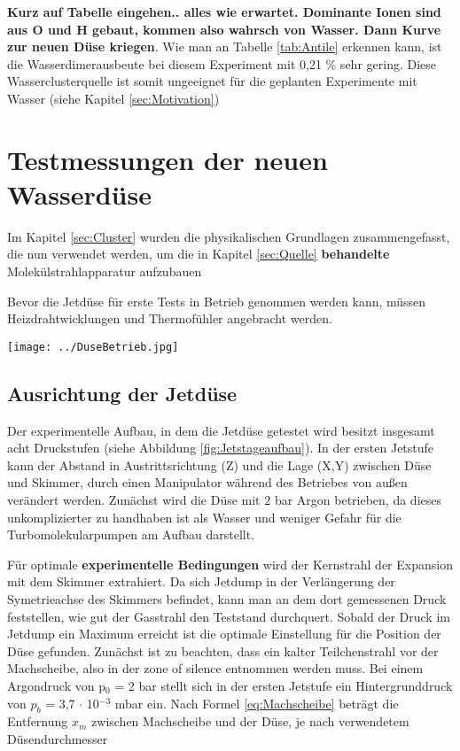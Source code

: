 \textbf{Kurz auf Tabelle eingehen.. alles wie erwartet. Dominante Ionen sind aus O und H gebaut, kommen also wahrsch von Wasser. Dann Kurve zur neuen Düse kriegen}.
Wie man an Tabelle \ref{tab:Antile} erkennen kann, ist die Wasserdimerausbeute bei diesem Experiment mit 0,21 \% sehr gering. Diese Wasserclusterquelle ist somit ungeeignet für die geplanten Experimente mit Wasser (siehe Kapitel \ref{sec:Motivation})

\section{Testmessungen der neuen Wasserdüse}

Im Kapitel \ref{sec:Cluster} wurden die physikalischen Grundlagen zusammengefasst, die nun verwendet werden, um die in Kapitel \ref{sec:Quelle} \textbf{behandelte} Molekülstrahlapparatur aufzubauen

Bevor die Jetdüse für erste Tests in Betrieb genommen werden kann, müssen Heizdrahtwicklungen und Thermofühler angebracht werden.

\begin{center}
\begin{minipage}{\linewidth}
\centering
\texttt{[image: ../DuseBetrieb.jpg]}%
 \label{fig:DuseBetrieb}
\end{minipage} 
\end{center} 

\subsection{Ausrichtung der Jetdüse}

Der experimentelle Aufbau, in dem die Jetdüse getestet wird besitzt insgesamt acht Druckstufen (siehe Abbildung \ref{fig:Jetstageaufbau}). In der ersten Jetstufe kann der Abstand in Austrittsrichtung (Z) und die Lage (X,Y) zwischen Düse und Skimmer, durch einen Manipulator während des Betriebes von außen verändert werden. Zunächst wird die Düse mit 2 bar Argon betrieben, da dieses unkomplizierter zu handhaben ist als Wasser und weniger Gefahr für die Turbomolekularpumpen am Aufbau darstellt. 

Für optimale \textbf{experimentelle Bedingungen} wird der Kernstrahl der Expansion mit dem Skimmer extrahiert. Da sich Jetdump in der Verlängerung der Symetrieachse des Skimmers befindet, kann man an dem dort gemessenen Druck feststellen, wie gut der Gasstrahl den Teststand durchquert.
Sobald der Druck im Jetdump ein Maximum erreicht ist die optimale Einstellung für die Position der Düse gefunden. Zunächst ist zu beachten, dass ein kalter Teilchenstrahl vor der Machscheibe, also in der zone of silence entnommen werden muss.
Bei einem Argondruck von p$_0$ = 2 bar stellt sich in der ersten Jetstufe ein Hintergrunddruck von $p_b$ = 3,7 $\cdot$ 10$^{-3}$ mbar ein. Nach Formel \ref{eq:Machscheibe} beträgt die Entfernung $x_m$ zwischen Machscheibe und der Düse, je nach verwendetem Düsendurchmesser


